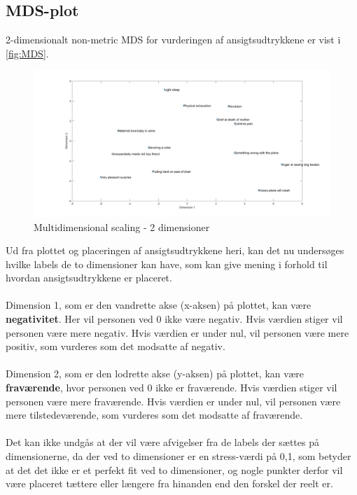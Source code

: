 \subsection*{MDS-plot}
2-dimensionalt non-metric MDS for vurderingen af ansigtsudtrykkene er vist i \autoref{fig:MDS}.  
%
\begin{figure}[H]
\centering
\includegraphics[width =\textwidth]{Figure/MDS_plot} 
\caption{Multidimensional scaling - 2 dimensioner}
\label{fig:MDS}
\end{figure}
%

\noindent Ud fra plottet og placeringen af ansigtsudtrykkene heri, kan det nu undersøges hvilke labels de to dimensioner kan have, som kan give mening i forhold til hvordan ansigtsudtrykkene er placeret. 
\\\\
Dimension 1, som er den vandrette akse (x-aksen) på plottet, kan være \textbf{negativitet}. Her vil personen ved 0 ikke være negativ. Hvis værdien stiger vil personen være mere negativ. Hvis værdien er under nul, vil personen være mere positiv, som vurderes som det modsatte af negativ. 
\\\\
Dimension 2, som er den lodrette akse (y-aksen) på plottet, kan være \textbf{fraværende}, hvor personen ved 0 ikke er fraværende. Hvis værdien stiger vil personen være mere fraværende. Hvis værdien er under nul, vil personen være mere tilstedeværende, som vurderes som det modsatte af fraværende. 
\\\\
Det kan ikke undgås at der vil være afvigelser fra de labels der sættes på dimensionerne, da der ved to dimensioner er en stress-værdi på 0,1, som betyder at det det ikke er et perfekt fit ved to dimensioner, og nogle punkter derfor vil være placeret tættere eller længere fra hinanden end den forskel der reelt er.